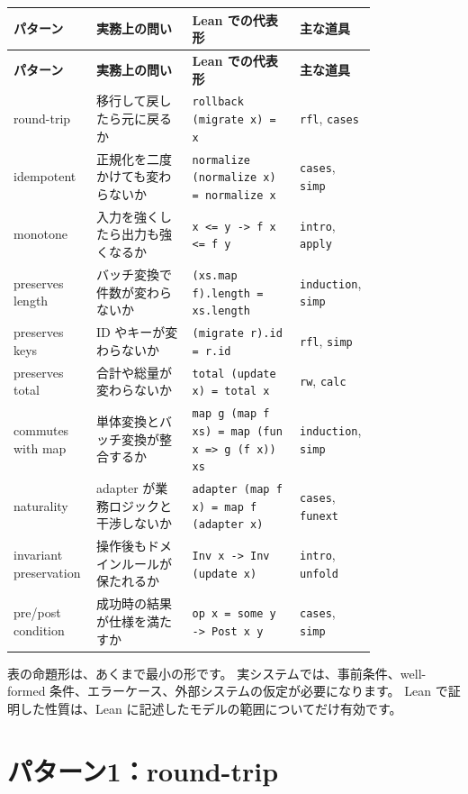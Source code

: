 \begin{longtable}{@{}p{0.15\linewidth}p{0.25\linewidth}p{0.28\linewidth}p{0.12\linewidth}@{}}
\toprule
\textbf{パターン} & \textbf{実務上の問い} & \textbf{Lean での代表形} & \textbf{主な道具} \\
\midrule
\endfirsthead
\toprule
\textbf{パターン} & \textbf{実務上の問い} & \textbf{Lean での代表形} & \textbf{主な道具} \\
\midrule
\endhead
round-trip & 移行して戻したら元に戻るか & \texttt{rollback (migrate x) = x} & \texttt{rfl}, \texttt{cases} \\
idempotent & 正規化を二度かけても変わらないか & \texttt{normalize (normalize x) = normalize x} & \texttt{cases}, \texttt{simp} \\
monotone & 入力を強くしたら出力も強くなるか & \texttt{x <= y -> f x <= f y} & \texttt{intro}, \texttt{apply} \\
preserves length & バッチ変換で件数が変わらないか & \texttt{(xs.map f).length = xs.length} & \texttt{induction}, \texttt{simp} \\
preserves keys & ID やキーが変わらないか & \texttt{(migrate r).id = r.id} & \texttt{rfl}, \texttt{simp} \\
preserves total & 合計や総量が変わらないか & \texttt{total (update x) = total x} & \texttt{rw}, \texttt{calc} \\
commutes with map & 単体変換とバッチ変換が整合するか & \texttt{map g (map f xs) = map (fun x => g (f x)) xs} & \texttt{induction}, \texttt{simp} \\
naturality & adapter が業務ロジックと干渉しないか & \texttt{adapter (map f x) = map f (adapter x)} & \texttt{cases}, \texttt{funext} \\
invariant preservation & 操作後もドメインルールが保たれるか & \texttt{Inv x -> Inv (update x)} & \texttt{intro}, \texttt{unfold} \\
pre/post condition & 成功時の結果が仕様を満たすか & \texttt{op x = some y -> Post x y} & \texttt{cases}, \texttt{simp} \\
\bottomrule
\end{longtable}

表の命題形は、あくまで最小の形です。
実システムでは、事前条件、well-formed 条件、エラーケース、外部システムの仮定が必要になります。
Lean で証明した性質は、Lean に記述したモデルの範囲についてだけ有効です。

\section{パターン1：round-trip}

